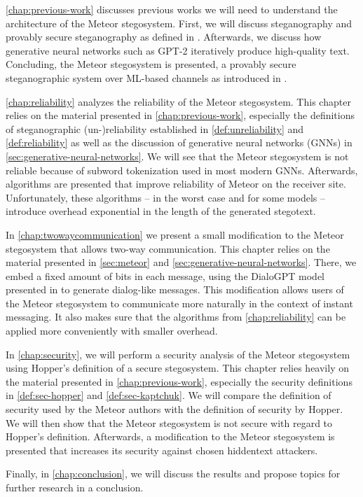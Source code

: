 \autoref{chap:previous-work} discusses previous works we will need to understand the architecture of the Meteor stegosystem.
First, we will discuss steganography and provably secure steganography as defined in \cite{Hopper2004}.
Afterwards, we discuss how generative neural networks such as GPT-2 iteratively produce high-quality text.
Concluding, the Meteor stegosystem is presented, a provably secure steganographic system over ML-based channels as introduced in \cite{Meteor2021}.

\autoref{chap:reliability} analyzes the reliability of the Meteor stegosystem. 
This chapter relies on the material presented in \autoref{chap:previous-work}, especially the definitions of steganographic (un-)reliability established in \autoref{def:unreliability} and \autoref{def:reliability} as well as the discussion of generative neural networks (GNNs) in \autoref{sec:generative-neural-networks}.
We will see that the Meteor stegosystem is not reliable because of subword tokenization used in most modern GNNs.
Afterwards, algorithms are presented that improve reliability of Meteor on the receiver site.
Unfortunately, these algorithms -- in the worst case and for some models -- introduce overhead exponential in the length of the generated stegotext.

In \autoref{chap:twowaycommunication} we present a small modification to the Meteor stegosystem that allows two-way communication.
This chapter relies on the material presented in \autoref{sec:meteor} and \autoref{sec:generative-neural-networks}.
There, we embed a fixed amount of bits in each message, using the DialoGPT model presented in \cite{Zhang2020} to generate dialog-like messages.
This modification allows users of the Meteor stegosystem to communicate more naturally in the context of instant messaging.
It also makes sure that the algorithms from \autoref{chap:reliability} can be applied more conveniently with smaller overhead.

In \autoref{chap:security}, we will perform a security analysis of the Meteor stegosystem using Hopper's definition of a secure stegosystem.
This chapter relies heavily on the material presented in \autoref{chap:previous-work}, especially the security definitions in \autoref{def:sec-hopper} and \autoref{def:sec-kaptchuk}.
We will compare the definition of security used by the Meteor authors with the definition of security by Hopper.
We will then show that the Meteor stegosystem is not secure with regard to Hopper's definition.
Afterwards, a modification to the Meteor stegosystem is presented that increases its security against chosen hiddentext attackers.

Finally, in \autoref{chap:conclusion}, we will discuss the results and propose topics for further research in a conclusion.